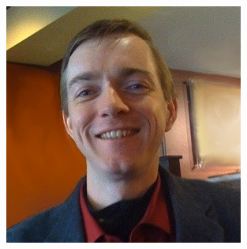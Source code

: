 \documentclass[xcolor=dvipsnames,red]{beamer}
\begin{document}
\begin{frame}
\begin{columns}
\begin{column}{.25\textwidth}
\includegraphics[width=.75\textwidth]{imgs/kyle_burton.jpg}
\end{column}


\end{columns}
\end{frame}
\end{document}
